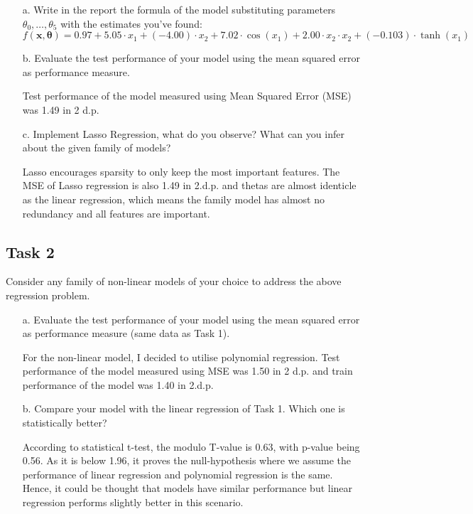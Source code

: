 \documentclass[11pt]{scrartcl}
\begin{document}
\begin{itemize}
	\item [a.] Write in the report the formula of the model substituting parameters $\theta_0, \ldots, \theta_5$ with the estimates you've found:
	$$f(\mathbf{x}, \boldsymbol{\theta}) =  0.97 + 5.05 \cdot x_1 + (-4.00) \cdot x_2 + 7.02 \cdot \cos(x_1) + 2.00 \cdot x_2 \cdot x_2 + (-0.103) \cdot \tanh(x_1)$$

 
    \item [b.] Evaluate the test performance of your model using the mean squared error as performance measure.
    
    Test performance of the model measured using Mean Squared Error (MSE) was 1.49 in 2 d.p. 
    
    \item [c.] Implement Lasso Regression, what do you observe? What can you infer about the given family of models?
    
    Lasso encourages sparsity to only keep the most important features. The MSE of Lasso regression is also 1.49 in 2.d.p. and thetas are almost identicle as the linear regression, which means the family model has almost no redundancy and all features are important.
\end{itemize}


\subsection*{Task 2}
Consider any family of non-linear models of your choice to address the above regression problem.
\begin{itemize}
	\item [a.] Evaluate the test performance of your model using the mean squared error as performance measure (same data as Task 1). 
	
	For the non-linear model, I decided to utilise polynomial regression. Test performance of the model measured using MSE was 1.50 in 2 d.p. and train performance of the model was 1.40 in 2.d.p.
	
	\item [b.] Compare your model with the linear regression of Task 1. Which one is {statistically} better?
	
	According to statistical t-test, the modulo T-value is 0.63, with p-value being 0.56. As it is below 1.96, it proves the null-hypothesis where we assume the performance of linear regression and polynomial regression is the same. Hence, it could be thought that models have similar performance but linear regression performs slightly better in this scenario.
	
\end{itemize}
\end{document}
